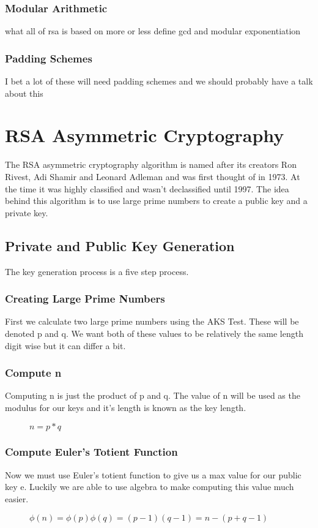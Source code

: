 \documentclass[conference]{IEEEtran}
\begin{document}
\subsubsection{Modular Arithmetic}
what all of rsa is based on more or less
define gcd and modular exponentiation

\subsubsection{Padding Schemes}
I bet a lot of these will need padding schemes and we should probably have a talk about this


\section{RSA Asymmetric Cryptography}

The RSA asymmetric cryptography algorithm is named after its creators Ron Rivest, Adi Shamir and Leonard Adleman and was first thought of in 1973. 
At the time it was highly classified and wasn't declassified until 1997.
The idea behind this algorithm is to use large prime numbers to create a public key and a private key. 
\subsection{Private and Public Key Generation}
The key generation process is a five step process. 

\subsubsection{Creating Large Prime Numbers}
First we calculate two large prime numbers using the AKS Test. These will be denoted p and q. We want both of these values to be relatively the same length digit wise but it can differ a bit. 

\subsubsection{Compute n}
Computing n is just the product of p and q. The value of n will be used as the modulus for our keys and it's length is known as the key length.

\begin{figure}[h]
	\begin{center}
		$n=p * q$
	\end{center}
\end{figure}

\subsubsection{Compute Euler's Totient Function}
Now we must use Euler's totient function to give us a max value for our public key e.
Luckily we are able to use algebra to make computing this value much easier.
\begin{figure}[h]
	\begin{center}
		$\phi \left(n\right)=\phi \left(p\right)\phi \left(q\right)=\left(p-1\right)\left(q-1\right)=n-\left(p+q-1\right)$
	\end{center}
\end{figure}
\end{document}
